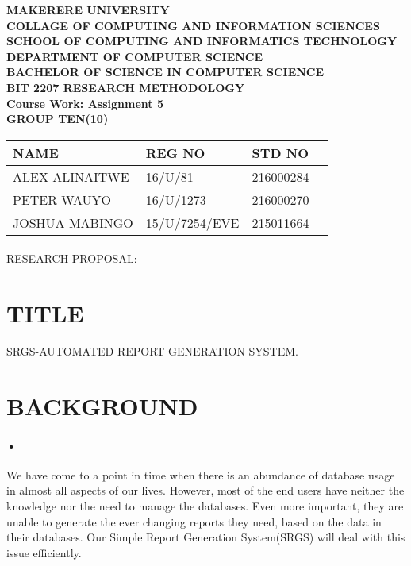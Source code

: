\documentclass[12pt]{article}
\begin{document}
\begin{Huge}
\begin{center}
\begin{normalsize}
\textbf{MAKERERE UNIVERSITY }\\
\textbf{COLLAGE OF COMPUTING AND INFORMATION SCIENCES} \\
\textbf{SCHOOL OF COMPUTING AND INFORMATICS TECHNOLOGY} \\
\textbf{DEPARTMENT OF COMPUTER SCIENCE} \\
\textbf{BACHELOR OF SCIENCE IN COMPUTER SCIENCE} \\
\textbf{BIT 2207 RESEARCH METHODOLOGY} \\
\textbf{Course Work: Assignment 5}\\
\textbf{GROUP TEN(10)}
\end{normalsize}
\end{center}
\end{Huge}

\begin{center}
\begin{tabular}{|l|l|l|c|}
\hline NAME  & REG NO & STD NO \\\hline
ALEX ALINAITWE & 16/U/81 & 216000284 \\\hline
PETER WAUYO & 16/U/1273 & 216000270 \\\hline
JOSHUA MABINGO & 15/U/7254/EVE & 215011664 \\\hline
\end{tabular}
\paragraph{}
RESEARCH PROPOSAL:
\end{center}

\newpage
\section{TITLE}
\begin{center}
SRGS-AUTOMATED REPORT GENERATION SYSTEM.
\end{center}

\section{BACKGROUND}
\paragraph{•}
We have come to a point in time when there is an abundance of database usage in almost all aspects of our lives. However, most of the end users have neither the knowledge nor the need to manage the databases. Even more important, they are unable to generate the ever changing reports they need, based on the data in their databases. Our Simple Report Generation System(SRGS) will deal with this issue efficiently. 
\end{document}

